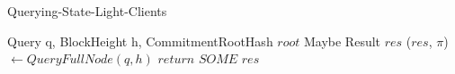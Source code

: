 \begin{algorithm}
\caption{Querying-State-Light-Clients}
\begin{algorithmic}
    \INPUT Query q, BlockHeight h, CommitmentRootHash $root$
    \OUTPUT Maybe Result $res$
    \STATE ($res$, $\pi$) $\leftarrow QueryFullNode (q, h)$
        \STATE $return$ $SOME$ $res$
    \ENDIF
\end{algorithmic}
\end{algorithm}